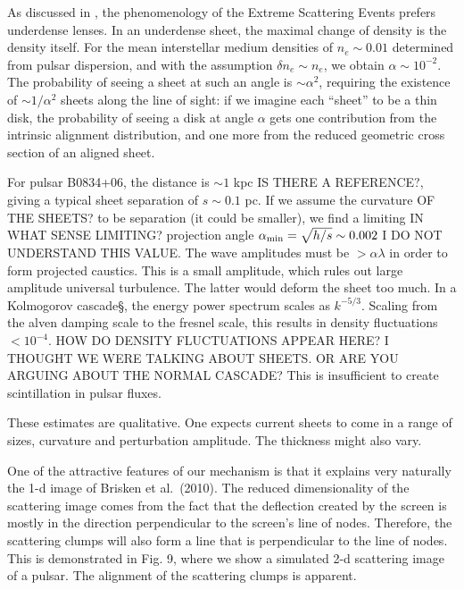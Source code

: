 \documentclass[useAMS,usenatbib]{mn2e}
\begin{document}
As discussed in \cite{2012MNRAS.421L.132P}, the  phenomenology of the
Extreme Scattering Events
prefers underdense lenses.  In an underdense sheet, the maximal change
of density is the density itself.  For the mean interstellar medium
densities of $n_e\sim 0.01$ determined from pulsar dispersion, and with the assumption
$\delta n_e\sim n_e$, we obtain $\alpha \sim
10^{-2}$.  The probability of seeing a sheet at such an angle is $\sim
\alpha^2$, requiring the existence of $\sim 1/\alpha^2$ sheets along
the line of sight: if we imagine each ``sheet'' to be a thin disk, the
probability of seeing a disk at angle $\alpha$ gets one contribution
from the intrinsic alignment distribution, and one more from the
reduced geometric cross section of an aligned sheet.

For pulsar
B0834+06, the distance is $\sim 1$ kpc IS THERE A REFERENCE?, giving a typical sheet
separation of $s \sim 0.1$ pc.  If we assume the curvature OF THE SHEETS? to be
separation (it could be smaller), we find a limiting IN WHAT SENSE LIMITING? projection angle
$\alpha_{\rm min} = \sqrt{h/s} \sim 0.002$ I DO NOT UNDERSTAND THIS VALUE.  The wave amplitudes must
be $> \alpha \lambda$ in order to form projected caustics.  This is a
small amplitude, which rules out large amplitude universal turbulence.
The latter would deform the sheet too much.  In a Kolmogorov cascade§,
the energy power spectrum scales as $k^{-5/3}$.  Scaling from the
alven damping scale to the fresnel scale, this results in density
fluctuations $< 10^{-4}$. HOW DO DENSITY FLUCTUATIONS APPEAR HERE?
I THOUGHT WE WERE TALKING ABOUT SHEETS. OR ARE YOU ARGUING ABOUT THE
NORMAL CASCADE?  This is insufficient to create
scintillation in pulsar fluxes.

These estimates are qualitative.  One expects current sheets to come
in a range of sizes, curvature and perturbation amplitude.  The
thickness might also vary.%

One of the attractive features of our mechanism is that it explains very naturally the 1-d
image of Brisken et al.~(2010). The reduced dimensionality of the scattering image comes from the
fact that the deflection created by the screen is mostly in the direction perpendicular to the
screen's line of nodes. Therefore, the scattering clumps will also form a line that is perpendicular
to the line of nodes. This is demonstrated in Fig. 9, where we show a simulated 2-d scattering  image of
 a pulsar. The alignment of the scattering clumps is apparent.
\end{document}
